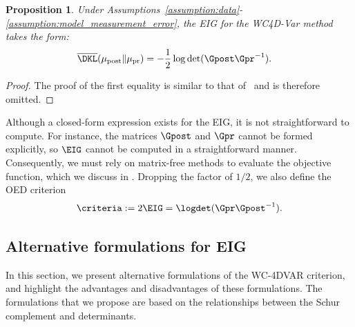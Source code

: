 \documentclass{aims} %
\newtheorem{proposition}[theorem]{Proposition}
\theoremstyle{definition}
\begin{document}
\begin{proposition}\label{prop:D-opt}
Under Assumptions~\ref{assumption:data}-\ref{assumption:model_measurement_error},  
the EIG for the WC4D-Var method takes the form: 
\begin{align}
\begin{aligned}
\overline{\DKL}(\mu_{\text{post}} \| \mu_{\text{pr}})
&=-\frac{1}{2}\log\det(\Gpost \Gpr^{-1}).%
\end{aligned}\label{eq:D_optimal}
\end{align}
\end{proposition}
\begin{proof}
The proof of the first equality is similar to that of~\cite[Section 4]{Alen}  and is therefore omitted.
\end{proof}
%
Although a closed-form expression exists for the EIG, it is not straightforward to compute.
For instance,  the matrices $\Gpost$ and $\Gpr$ cannot be formed explicitly, so $\EIG$ cannot be computed in a straightforward manner. Consequently, we must rely on matrix-free methods to evaluate the objective function, which we discuss in . 
%
Dropping the factor of $1/2$, we also define the OED criterion
\begin{equation}
    \label{eqn:criterion}
    \criteria := 2\EIG = \logdet(\Gpr\Gpost^{-1}).
\end{equation}


 
\subsection{Alternative formulations for EIG}\label{section:Alternative_formulations}

In this section, we present alternative formulations of the WC-4DVAR criterion, and highlight the advantages and disadvantages of these formulations.
%
The formulations that we propose are based on the relationships between the Schur complement and determinants. 
\end{document}
